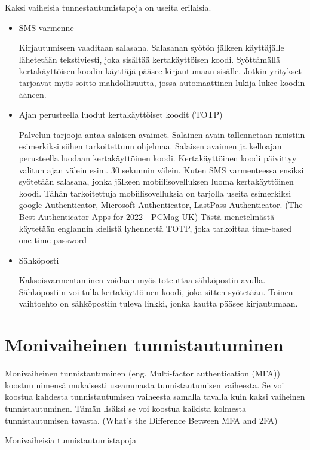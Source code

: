 Kaksi vaiheisia tunnestautumistapoja on useita erilaisia. 


\begin{itemize}
    \item SMS varmenne
    
    Kirjautumiseen vaaditaan salasana. Salasanan syötön jälkeen käyttäjälle lähetetään tekstiviesti, joka sisältää kertakäyttöisen koodi. Syöttämällä kertakäyttöisen koodin käyttäjä pääsee kirjautumaan sisälle. Jotkin yritykset tarjoavat myös soitto mahdollisuutta, jossa automaattinen lukija lukee koodin ääneen. 
    \item Ajan perusteella luodut kertakäyttöiset koodit (TOTP)
    
    Palvelun tarjooja antaa salaisen avaimet. Salainen avain tallennetaan muistiin esimerkiksi siihen tarkoitettuun ohjelmaa. Salaisen avaimen ja kelloajan perusteella luodaan kertakäyttöinen koodi.  Kertakäyttöinen koodi päivittyy valitun ajan välein esim. 30 sekunnin välein. Kuten SMS varmenteessa ensiksi syötetään salasana, jonka jälkeen mobiilisovelluksen luoma kertakäyttöinen koodi. Tähän tarkoitettuja mobiilisovelluksia on tarjolla useita esimerkiksi google Authenticator, Microsoft Authenticator, LastPass Authenticator. (The Best Authenticator Apps for 2022 - PCMag UK) Tästä menetelmästä käytetään englannin kielistä lyhennettä TOTP, joka tarkoittaa time-based one-time password
    
    \item Sähköposti
    
    Kaksoisvarmentaminen voidaan myös toteuttaa sähköpostin avulla. Sähköpostiin voi tulla kertakäyttöinen koodi, joka sitten syötetään. Toinen vaihtoehto on sähköpostiin tuleva linkki, jonka kautta pääsee kirjautumaan. 
\end{itemize}

\section{Monivaiheinen tunnistautuminen}

Monivaiheinen tunnistautuminen (eng. Multi-factor authentication (MFA)) koostuu nimensä mukaisesti useammasta tunnistautumisen vaiheesta. Se voi koostua kahdesta tunnistautumisen vaiheesta samalla tavalla kuin kaksi vaiheinen tunnistautuminen. Tämän lisäksi se voi koostua kaikista kolmesta tunnistautumisen tavasta. (What's the Difference Between MFA and 2FA)

Monivaiheisia tunnistautumistapoja

